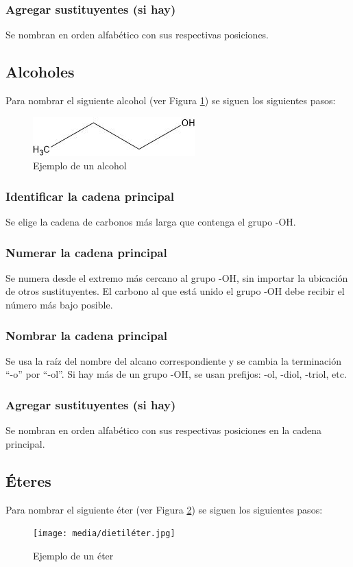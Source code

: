 \documentclass{article}
\begin{document}
\subsubsection{Agregar sustituyentes (si hay)}
Se nombran en orden alfabético con sus respectivas posiciones.

\subsection{Alcoholes}
Para nombrar el siguiente alcohol (ver Figura \ref{fig:alcohol}) se siguen los siguientes pasos:
\begin{figure}[h]
    \centering
    \includegraphics[width=0.5\linewidth]{media/propanol.jpg}
    \caption{Ejemplo de un alcohol}
    \label{fig:alcohol}
\end{figure}

\subsubsection{Identificar la cadena principal}
Se elige la cadena de carbonos más larga que contenga el grupo -OH.

\subsubsection{Numerar la cadena principal}
Se numera desde el extremo más cercano al grupo -OH, sin importar la ubicación de otros sustituyentes. El carbono al que está unido el grupo -OH debe recibir el número más bajo posible.

\subsubsection{Nombrar la cadena principal}
Se usa la raíz del nombre del alcano correspondiente y se cambia la terminación ``-o'' por ``-ol''. Si hay más de un grupo -OH, se usan prefijos: -ol, -diol, -triol, etc.

\subsubsection{Agregar sustituyentes (si hay)}
Se nombran en orden alfabético con sus respectivas posiciones en la cadena principal.

\subsection{Éteres}
Para nombrar el siguiente éter (ver Figura \ref{fig:eter}) se siguen los siguientes pasos:
\begin{figure}[h]
    \centering
    \texttt{[image: media/dietiléter.jpg]}
    \caption{Ejemplo de un éter}
    \label{fig:eter}
\end{figure}
\end{document}
